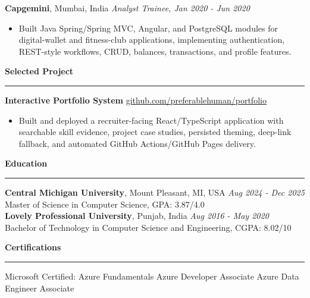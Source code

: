 \documentclass[11pt,letterpaper]{article}
\newcommand{\ressection}[1]{\Needspace{6\baselineskip}\vspace{8pt}\par\textbf{#1}\par\vspace{2pt}\hrule\vspace{5pt}}
\begin{document}
\textbf{Capgemini}, Mumbai, India \hfill \textit{Analyst Trainee, Jan 2020 - Jun 2020}
\begin{itemize}
  \item Built Java Spring/Spring MVC, Angular, and PostgreSQL modules for digital-wallet and fitness-club applications, implementing authentication, REST-style workflows, CRUD, balances, transactions, and profile features.
\end{itemize}

\ressection{Selected Project}
\textbf{Interactive Portfolio System} \hfill \href{https://github.com/preferablehuman/portfolio}{github.com/preferablehuman/portfolio}
\begin{itemize}
  \item Built and deployed a recruiter-facing React/TypeScript application with searchable skill evidence, project case studies, persisted theming, deep-link fallback, and automated GitHub Actions/GitHub Pages delivery.
\end{itemize}

\ressection{Education}
\textbf{Central Michigan University}, Mount Pleasant, MI, USA \hfill \textit{Aug 2024 - Dec 2025}\\
Master of Science in Computer Science, GPA: 3.87/4.0\\[2pt]
\textbf{Lovely Professional University}, Punjab, India \hfill \textit{Aug 2016 - May 2020}\\
Bachelor of Technology in Computer Science and Engineering, CGPA: 8.02/10

\ressection{Certifications}
Microsoft Certified: Azure Fundamentals \textbar{} Azure Developer Associate \textbar{} Azure Data Engineer Associate
\end{document}
